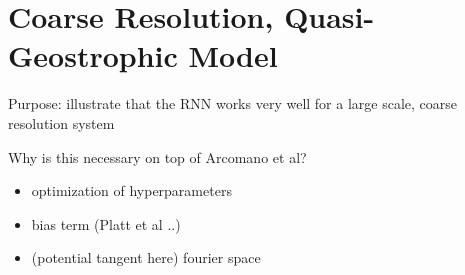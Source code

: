 \section{Coarse Resolution, Quasi-Geostrophic Model}
\label{sec:maooam}

Purpose: illustrate that the RNN works very well for a large scale, coarse
resolution system

Why is this necessary on top of Arcomano et al?
\begin{itemize}
    \item optimization of hyperparameters
    \item bias term (Platt et al ..)
    \item (potential tangent here) fourier space
\end{itemize}


